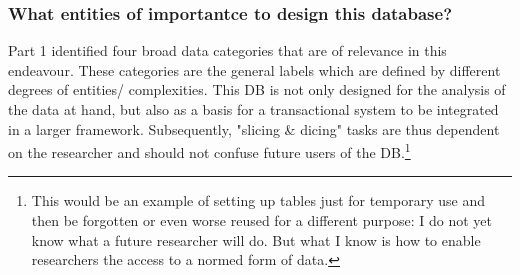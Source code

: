 \documentclass[a4paper]{article}
\begin{document}
\subsubsection{What entities of importantce to design this database?}
Part 1 identified four broad data categories that are of relevance in this endeavour. These categories are the general labels which are defined by different degrees of entities/ complexities. This DB is not only designed for the analysis of the data at hand, but also as a basis for a transactional system to be integrated in a larger framework. Subsequently, "slicing \& dicing" tasks are thus dependent on the researcher and should not confuse future users of the DB.\footnote{This would be an example of setting up tables just for temporary use and then be forgotten or even worse reused for a different purpose: I do not yet know what a future researcher will do. But what I know is how to enable researchers the access to a normed form of data.}
\end{document}
